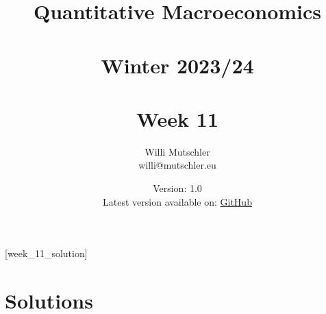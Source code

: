 
\newif\ifDisplaySolutions\DisplaySolutionstrue


\title{Quantitative Macroeconomics\\~\\Winter 2023/24\\~\\Week 11}
\author{Willi Mutschler\\willi@mutschler.eu}
\date{Version: 1.0\\Latest version available on: \href{https://github.com/wmutschl/Quantitative-Macroeconomics/releases/latest/download/week_11.pdf}{GitHub}}
\maketitle\thispagestyle{empty}

\newpage
{}[week_11_solution]
\tableofcontents\thispagestyle{empty}\newpage

\setcounter{page}{1}
\newpage
\newpage
\newpage
\printbibliography
\newpage

\ifDisplaySolutions
\newpage
\appendix
\section{Solutions}

\fi
